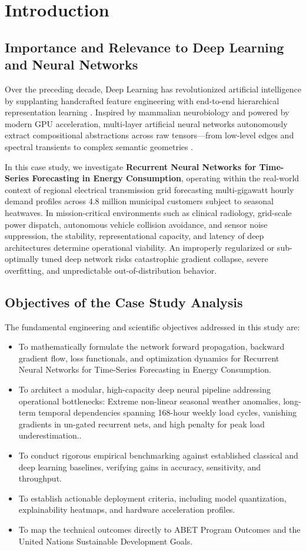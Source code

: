 \section{Introduction}

\subsection{Importance and Relevance to Deep Learning and Neural Networks}
Over the preceding decade, Deep Learning has revolutionized artificial intelligence by supplanting handcrafted feature engineering with end-to-end hierarchical representation learning \cite{lecun2015deep}. Inspired by mammalian neurobiology and powered by modern GPU acceleration, multi-layer artificial neural networks autonomously extract compositional abstractions across raw tensors---from low-level edges and spectral transients to complex semantic geometries \cite{goodfellow2016deep}.

In this case study, we investigate \textbf{Recurrent Neural Networks for Time-Series Forecasting in Energy Consumption}, operating within the real-world context of regional electrical transmission grid forecasting multi-gigawatt hourly demand profiles across 4.8 million municipal customers subject to seasonal heatwaves. In mission-critical environments such as clinical radiology, grid-scale power dispatch, autonomous vehicle collision avoidance, and sensor noise suppression, the stability, representational capacity, and latency of deep architectures determine operational viability. An improperly regularized or sub-optimally tuned deep network risks catastrophic gradient collapse, severe overfitting, and unpredictable out-of-distribution behavior.

\subsection{Objectives of the Case Study Analysis}
The fundamental engineering and scientific objectives addressed in this study are:
\begin{itemize}
  \item To mathematically formulate the network forward propagation, backward gradient flow, loss functionals, and optimization dynamics for Recurrent Neural Networks for Time-Series Forecasting in Energy Consumption.
  \item To architect a modular, high-capacity deep neural pipeline addressing operational bottlenecks: Extreme non-linear seasonal weather anomalies, long-term temporal dependencies spanning 168-hour weekly load cycles, vanishing gradients in un-gated recurrent nets, and high penalty for peak load underestimation..
  \item To conduct rigorous empirical benchmarking against established classical and deep learning baselines, verifying gains in accuracy, sensitivity, and throughput.
  \item To establish actionable deployment criteria, including model quantization, explainability heatmaps, and hardware acceleration profiles.
  \item To map the technical outcomes directly to ABET Program Outcomes and the United Nations Sustainable Development Goals.
\end{itemize}
